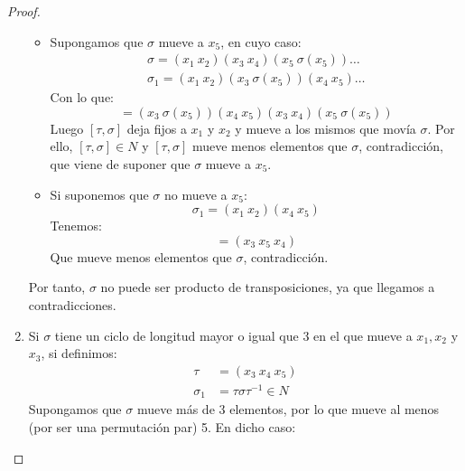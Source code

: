 \begin{teo}[de Abel]
\begin{proof}
\begin{enumerate}
                \begin{itemize}
                    \item Supongamos que $\sigma$ mueve a $x_5$, en cuyo caso:
                        \begin{gather*}
                            \sigma = (x_1\ x_2)(x_3\ x_4)(x_5\ \sigma(x_5))\ldots \\
                            \sigma_1 = (x_1\ x_2)(x_3\ \sigma(x_5))(x_4\ x_5)\ldots
                        \end{gather*}
                        Con lo que:
                        \begin{equation*}
                            [\tau, \sigma] = (x_3\ \sigma(x_5))(x_4\ x_5)(x_3\ x_4)(x_5\ \sigma(x_5))
                        \end{equation*}
                        Luego $[\tau, \sigma]$ deja fijos a $x_1$ y $x_2$ y mueve a los mismos que movía $\sigma$. Por ello, $[\tau, \sigma]\in N$ y $[\tau, \sigma]$ mueve menos elementos que $\sigma$, contradicción, que viene de suponer que $\sigma$ mueve a $x_5$.
                    \item Si suponemos que $\sigma$ no mueve a $x_5$:
                        \begin{equation*}
                            \sigma_1 = (x_1\ x_2)(x_4\ x_5)
                        \end{equation*}
                        Tenemos:
                        \begin{equation*}
                            [\tau, \sigma] = (x_3\ x_5\ x_4)
                        \end{equation*}
                        Que mueve menos elementos que $\sigma$, contradicción.
                \end{itemize}
                Por tanto, $\sigma$ no puede ser producto de transposiciones, ya que llegamos a contradicciones.
            \item Si $\sigma$ tiene un ciclo de longitud mayor o igual que 3 en el que mueve a $x_1,x_2$ y $x_3$, si definimos:
                \begin{align*}
                    \tau &= (x_3\ x_4\ x_5) \\
                    \sigma_1 &= \tau \sigma \tau^{-1}  \in N
                \end{align*}
                Supongamos que $\sigma$ mueve más de 3 elementos, por lo que mueve al menos (por ser una permutación par) 5. En dicho caso:
                \begin{equation*}

\end{equation*}
\end{enumerate}
\end{proof}
\end{teo}

